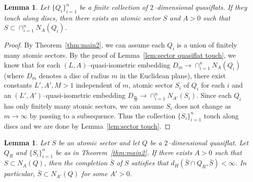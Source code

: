 \documentclass[11pt]{amsart}
\newtheorem{lemma}[theorem]{Lemma}
\theoremstyle{definition}
\begin{document}
\begin{lemma}
	\label{lem:intersection of quasiflats contain a sector}
	Let $\{Q_i\}_{i=1}^{n}$ be a finite collection of $2$--dimensional quasiflats. If they touch along discs, then there exists an atomic sector $S$ and $A>0$ such that $S\subset \cap_{i=1}^{n}N_A(Q_i)$.
\end{lemma}

\begin{proof}
By Theorem~\ref{thm:main2}, we can assume each $Q_i$ is a union of finitely many atomic sectors. By the proof of Lemma~\ref{lem:sector quasiflat touch}, we know that for each $(L,A)$--quasi-isometric embedding $D_m\to \cap_{i=1}^{n}N_A(Q_i)$ (where $D_m$ denotes a disc of radius $m$ in the Euclidean plane), there exist constants $L',A',M>1$ independent of $m$, atomic sector $S_i$ of $Q_i$ for each $i$ and an $(L',A')$--quasi-isometric embedding $D_{\frac{m}{M}}\to \cap_{i=1}^{n}N_{A'}(S_i)$. Since each $Q_i$ has only finitely many atomic sectors, we can assume $S_i$ does not change as $m\to \infty$ by passing to a subsequence. Thus the collection $\{S_i\}_{i=1}^{n}$ touch along discs and we are done by Lemma~\ref{lem:sector touch}.
\end{proof}


\begin{lemma}
	\label{lem:completion containment}
Let $S$ be an atomic sector and let $Q$ be a $2$--dimensional quasiflat. Let $Q_R$ and $\{S_i\}_{i=1}^{n}$ be as in Theorem~\ref{thm:main2}. If there exists $A>0$ such that $S\subset N_A(Q)$, then the completion $\bar S$ of $S$ satisfies that $d_H(\bar S\cap Q_R,\bar S)<\infty$. In particular, $\bar S\subset N_{A'}(Q)$ for some $A'>0$.	
\end{lemma}
\end{document}
